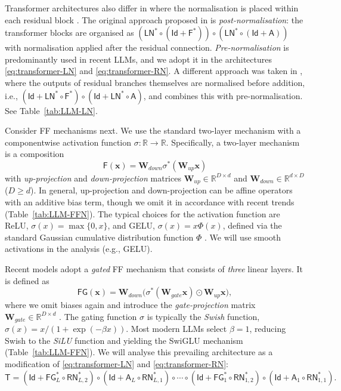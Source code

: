 \documentclass[namedate,webpdf,imanum]{ima-authoring-template}
\newcommand{\Real}{\mathbb{R}}
\newcommand{\Matrix}[1]{\mathbf{#1}}
\newcommand{\hap}{\mathbin{\odot}}
\newcommand{\Layer}[1]{\mathsf{#1}}
\newcommand{\Id}{\Layer{Id}}
\numberwithin{equation}{section}
\begin{document}
Transformer architectures also differ in where the normalisation is placed within each residual block \citep{xiong2020layer}.
The original approach proposed in \cite{vaswani2017attention} is \emph{post-normalisation}: the transformer blocks are organised as $(\Layer{LN}^\ast \circ (\Id + \Layer{F}^\ast)) \circ (\Layer{LN}^\ast \circ (\Id + \Layer{A}))$ with normalisation applied after the residual connection.
\emph{Pre-normalisation} is predominantly used in recent LLMs, and we adopt it in the architectures \eqref{eq:transformer-LN} and \eqref{eq:transformer-RN}.
A different approach was taken in \cite{walsh20252}, where the outputs of residual branches themselves are normalised before addition, i.e., $(\Id + \Layer{LN}^\ast \circ \Layer{F}^\ast) \circ (\Id + \Layer{LN}^\ast \circ \Layer{A})$, and \cite{riviere2024gemma} combines this with pre-normalisation.
See Table~\ref{tab:LLM-LN}.

Consider FF mechanisms next.
We use the standard two-layer mechanism with a componentwise activation function $\sigma : \Real \to \Real$.
Specifically, a two-layer mechanism is a composition
\begin{equation}
\label{eq:ffn-gelu}
    \Layer{F}(\Matrix{x}) = \Matrix{W}_{down} \sigma^\ast(\Matrix{W}_{up} \Matrix{x})
\end{equation}
with \emph{up-projection} and \emph{down-projection} matrices $\Matrix{W}_{up} \in \Real^{D \times d}$ and $\Matrix{W}_{down} \in \Real^{d \times D}$ ($D \geq d$).
In general, up-projection and down-projection can be affine operators with an additive bias term, though we omit it in accordance with recent trends (Table~\ref{tab:LLM-FFN}).
The typical choices for the activation function are ReLU, $\sigma(x) = \max\{ 0, x \}$, and GELU, $\sigma(x) = x \Phi(x)$, defined via the standard Gaussian cumulative distribution function $\Phi$ \citep{hendrycks2016gaussian}.
We will use smooth activations in the analysis (e.g., GELU).

Recent models adopt a \emph{gated} FF mechanism that consists of \emph{three} linear layers.
It is defined as
\begin{equation}
\label{eq:ffn-swiglu}
    \Layer{FG}(\Matrix{x}) = \Matrix{W}_{down} \Big( \sigma^\ast(\Matrix{W}_{gate}\Matrix{x}) \hap \Matrix{W}_{up} \Matrix{x} \Big),
\end{equation}
where we omit biases again and introduce the \emph{gate-projection} matrix $\Matrix{W}_{gate} \in \Real^{D \times d}$ \citep{shazeer2020glu}.
The gating function $\sigma$ is typically the \emph{Swish} function, $\sigma(x) = x / (1 + \exp(-\beta x))$.
Most modern LLMs select $\beta = 1$, reducing Swish to the \emph{SiLU} function and yielding the SwiGLU mechanism (Table~\ref{tab:LLM-FFN}).
We will analyse this prevailing architecture as a modification of \eqref{eq:transformer-LN} and \eqref{eq:transformer-RN}:
\begin{equation}
\label{eq:transformer-SwiGLU}
    \Layer{T} = (\Id + \Layer{FG}_L^\ast \circ \Layer{RN}_{L,2}^\ast) \circ (\Id + \Layer{A}_L \circ \Layer{RN}_{L,1}^\ast) \circ \cdots \circ (\Id + \Layer{FG}_1^\ast \circ \Layer{RN}_{1,2}^\ast) \circ (\Id + \Layer{A}_1 \circ \Layer{RN}_{1,1}^\ast).
\end{equation}
\end{document}

